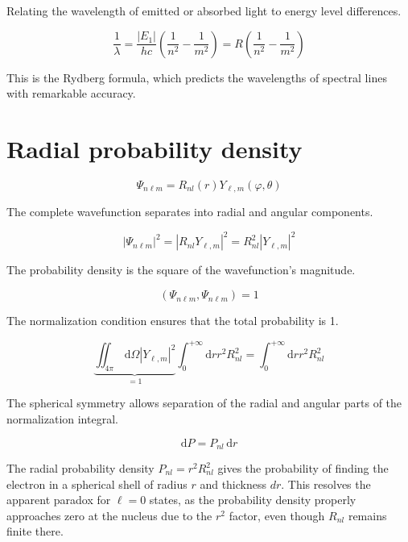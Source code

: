 Relating the wavelength of emitted or absorbed light to energy level differences.

\begin{equation}
\frac{1}{\lambda}=\frac{\left|E_{1}\right|}{h c}\left(\frac{1}{n^{2}}-\frac{1}{m^{2}}\right)=R\left(\frac{1}{n^{2}}-\frac{1}{m^{2}}\right)
\end{equation}

This is the Rydberg formula, which predicts the wavelengths of spectral lines with remarkable accuracy.

\section{Radial probability density}

\begin{equation}
\Psi_{n \ell m}=R_{n l}(r) Y_{\ell, m}(\varphi, \theta)
\end{equation}

The complete wavefunction separates into radial and angular components.

\begin{equation}
\left|\Psi_{n \ell m}\right|^{2}=\left|R_{n l} Y_{\ell, m}\right|^{2}=R_{n l}^{2}\left|Y_{\ell, m}\right|^{2}
\end{equation}

The probability density is the square of the wavefunction's magnitude.

\begin{equation}
\left(\Psi_{n \ell m}, \Psi_{n \ell m}\right)=1
\end{equation}

The normalization condition ensures that the total probability is 1.

\begin{equation}
\underbrace{\iint_{4 \pi} \, \mathrm{d} \Omega\left|Y_{\ell, m}\right|^{2}}_{=1} \int_{0}^{+\infty} \mathrm{d} r r^{2} R_{n l}^{2}=\int_{0}^{+\infty} \mathrm{d} r r^{2} R_{n l}^{2}
\end{equation}

The spherical symmetry allows separation of the radial and angular parts of the normalization integral.

\begin{equation}
\mathrm{d} P=P_{n l} \, \mathrm{d} r
\end{equation}

The radial probability density $P_{nl} = r^2 R_{nl}^2$ gives the probability of finding the electron in a spherical shell of radius $r$ and thickness $dr$. This resolves the apparent paradox for $\ell=0$ states, as the probability density properly approaches zero at the nucleus due to the $r^2$ factor, even though $R_{nl}$ remains finite there.

